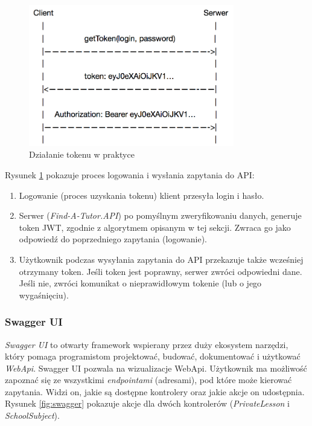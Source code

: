 \documentclass[12pt]{article}
\numberwithin{figure}{section}
\begin{document}
\begin{sloppypar}
    \begin{figure}[H] 
     	\centering
    	\includegraphics[width=0.8\textwidth]{images/chapter_3/token-diagram.png}
    	\caption{Działanie tokenu w praktyce \cite{token-diagram}}
    	\label{fig:token-diagram}
    \end{figure}
    
    Rysunek \ref{fig:token-diagram} pokazuje proces logowania i wysłania zapytania do API:
    \begin{enumerate}
        \item Logowanie (proces uzyskania tokenu) klient przesyła login i hasło.
        \item Serwer (\textit{Find-A-Tutor.API}) po pomyślnym zweryfikowaniu danych, generuje token JWT, zgodnie z algorytmem opisanym w tej sekcji. Zwraca go jako odpowiedź do poprzedniego zapytania (logowanie).
        \item Użytkownik podczas wysyłania zapytania do API przekazuje także wcześniej otrzymany token. Jeśli token jest poprawny, serwer zwróci odpowiedni dane. Jeśli nie, zwróci komunikat o nieprawidłowym tokenie (lub o jego wygaśnięciu).
    \end{enumerate}
    
\subsubsection{Swagger UI}
\textit{Swagger UI} to otwarty framework wspierany przez duży ekosystem narzędzi, który pomaga programistom projektować, budować, dokumentować i użytkować \textit{WebApi}. 
Swagger UI pozwala na wizualizacje WebApi. Użytkownik ma możliwość zapoznać się ze wszystkimi \textit{endpointami} (adresami), pod które może kierować zapytania. Widzi on, jakie są dostępne kontrolery oraz jakie akcje on udostępnia. Rysunek \ref{fig:swagger} pokazuje akcje dla dwóch kontrolerów (\textit{PrivateLesson} i \textit{SchoolSubject}). 
    

\end{sloppypar}
\end{document}
